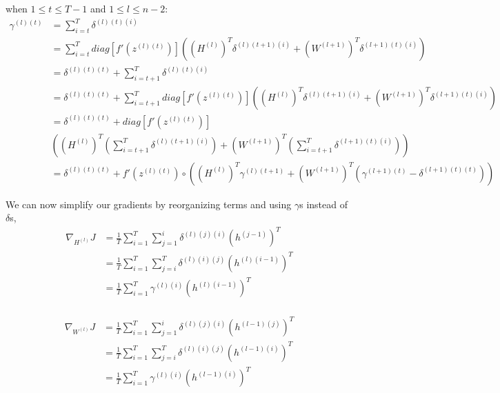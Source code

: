 \documentclass{article}
\begin{document}
	when $1 \le t \le T-1$ and $1 \le l \le n-2$:
	\begin{equation}
	\begin{aligned}
		\gamma^{(l)(t)} 
		&= \sum_{i=t}^{T} \delta^{(l)(t)(i)} \\
		&= \sum_{i=t}^{T} diag[f'(z^{(l)(t)})] ((H^{(l)})^T \delta^{(l)(t+1)(i)} + (W^{(l+1)})^T \delta^{(l+1)(t)(i)}) \\
		&= \delta^{(l)(t)(t)} + \sum_{i=t+1}^{T} \delta^{(l)(t)(i)} \\
		&= \delta^{(l)(t)(t)} + \sum_{i=t+1}^{T} diag[f'(z^{(l)(t)})] ((H^{(l)})^T \delta^{(l)(t+1)(i)} + (W^{(l+1)})^T \delta^{(l+1)(t)(i)}) \\
		&= \delta^{(l)(t)(t)} + diag[f'(z^{(l)(t)})] \\
		&\left( (H^{(l)})^T \left(\sum_{i=t+1}^{T} \delta^{(l)(t+1)(i)}\right) + (W^{(l+1)})^T \left(\sum_{i=t+1}^{T} \delta^{(l+1)(t)(i)}\right) \right) \\		
		&= \delta^{(l)(t)(t)} + f'(z^{(l)(t)}) \circ ( (H^{(l)})^T \gamma^{(l)(t+1)} + (W^{(l+1)})^T (\gamma^{(l+1)(t)} - \delta^{(l+1)(t)(t)}))
	\end{aligned}
	\end{equation}
	
	We can now simplify our gradients by reorganizing terms and using $\gamma$s instead of $\delta$s,
	\begin{equation}
	\begin{aligned}
		\nabla_{H^{(l)}} J 
		&= \frac{1}{T}\sum_{i=1}^{T} \sum_{j=1}^{i} \delta^{(l)(j)(i)}  (h^{(j-1)})^T\\
		&= \frac{1}{T} \sum_{i=1}^{T} \sum_{j=i}^{T} \delta^{(l)(i)(j)}  (h^{(l)(i-1)})^T\\
		&= \frac{1}{T} \sum_{i=1}^{T} \gamma^{(l)(i)}  (h^{(l)(i-1)})^T\\
	\end{aligned}
	\end{equation}
	
	\begin{equation}
	\begin{aligned}
		\nabla_{W^{(l)}} J 
		&= \frac{1}{T} \sum_{i=1}^{T} \sum_{j=1}^{i} \delta^{(l)(j)(i)}  (h^{(l-1)(j)})^T\\
		&= \frac{1}{T} \sum_{i=1}^{T} \sum_{j=i}^{T} \delta^{(l)(i)(j)}  (h^{(l-1)(i)})^T\\
		&= \frac{1}{T} \sum_{i=1}^{T} \gamma^{(l)(i)}  (h^{(l-1)(i)})^T\\
	\end{aligned}
	\end{equation}
	
\end{document}
